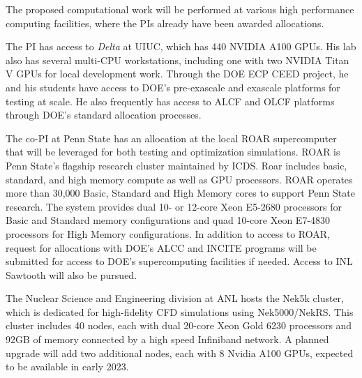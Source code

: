 

\vspace{.00in}

\noindent
The proposed computational work will be performed at various high performance
computing facilities, where the PIs already have been awarded allocations.

The PI has access to {\em Delta} at UIUC, which has 440 NVIDIA A100 GPUs.  His
lab also has several multi-CPU workstations, including one with two NVIDIA
Titan V GPUs for local development work.  Through the DOE ECP CEED project, he
and his students have access to DOE's pre-exascale and exascale platforms for
testing at scale.  He also frequently has access to ALCF and OLCF platforms
through DOE's standard allocation processes.

The co-PI at Penn State has an allocation at the local ROAR supercomputer that
will be leveraged for both testing and optimization simulations. ROAR is Penn
State’s flagship research cluster maintained by ICDS. Roar includes basic,
standard, and high memory compute as well as GPU processors. ROAR operates more
than 30,000 Basic, Standard and High Memory cores to support Penn State
research. The system provides dual 10- or 12-core Xeon E5-2680 processors for
Basic and Standard memory configurations and quad 10-core Xeon E7-4830
processors for High Memory configurations. In addition to access to ROAR,
request for allocations with DOE’s ALCC and INCITE programs will be submitted
for access to DOE’s supercomputing facilities if needed. Access to INL Sawtooth
will also be pursued.

The Nuclear Science and Engineering division at ANL hosts the Nek5k cluster,
which is dedicated for high-fidelity CFD simulations using Nek5000/NekRS. This
cluster includes 40 nodes, each with dual 20-core Xeon Gold 6230 processors and
92GB of memory connected by a high speed Infiniband network. A planned upgrade
will add two additional nodes, each with 8 Nvidia A100 GPUs, expected to be
available in early 2023.
\\
